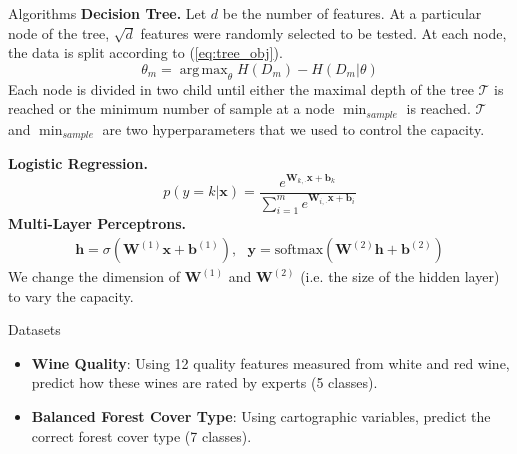 \documentclass[final]{beamer}
\newcommand{\softmax}{\mathrm{softmax}}
\DeclareMathOperator*{\argmax}{arg\,max}
\newlength{\onecolwid}
\begin{document}
\begin{frame}[t]
\begin{columns}[t]
\begin{column}{\onecolwid}
\begin{block}{Algorithms}
\textbf{Decision Tree.} Let $d$ be the number of features. At a particular node of the tree, $\sqrt{d}$ features were randomly selected to be tested. At each node, the data is split according to (\ref{eq:tree_obj}).
\begin{equation}
    \theta_m = \argmax_{\theta} H(D_m)-H(D_m|\theta)
    \label{eq:tree_obj}
\end{equation}
Each node is divided in two child until either the maximal depth of the tree $\mathcal{T}$ is reached or the minimum number of sample at a node $\min_{sample}$ is reached. $\mathcal{T}$ and $\min_{sample}$ are two hyperparameters that we used to control the capacity.

\textbf{Logistic Regression.}
\begin{equation}
     p(y=k|\mathbf{x}) = \frac{
     e^{
     \mathbf{W}_{k, \cdot}\mathbf{x}+\mathbf{b}_k
     }
     }
     {
     \sum_{i=1}^m e^{
     \mathbf{W}_{i, \cdot}\mathbf{x}+\mathbf{b}_i
     }
     }
\end{equation}
\textbf{Multi-Layer Perceptrons.}
\begin{equation}
    \begin{split}
        \mathbf{h} = \sigma(\mathbf{W}^{(1)}\mathbf{x} + \mathbf{b}^{(1)}),~~~
        \mathbf{y} = \softmax(\mathbf{W}^{(2)}\mathbf{h} + \mathbf{b}^{(2)}) 
    \end{split}
    \label{eq:mlp}
\end{equation}
We change the dimension of $\mathbf{W}^{(1)}$ and $\mathbf{W}^{(2)}$ (i.e. the size of the hidden layer) to vary the capacity.
\end{block}

\begin{block}{Datasets}

\begin{itemize}
    \item \textbf{Wine Quality}: Using 12 quality features measured from white and red wine, predict how these wines are rated by experts (5 classes).
    \item \textbf{Balanced Forest Cover Type}: Using cartographic variables, predict the correct forest cover type (7 classes).
\end{itemize}


\end{block}
\end{column}
\end{columns}
\end{frame}
\end{document}
